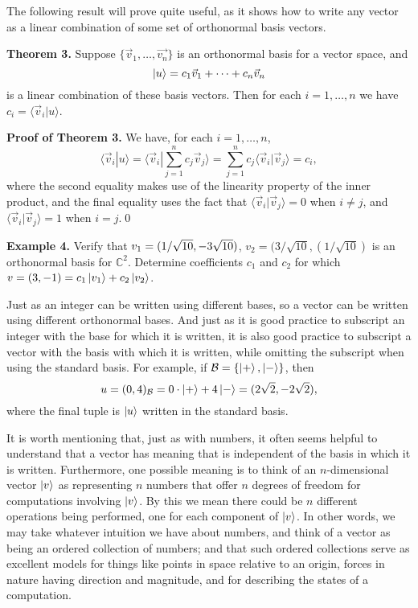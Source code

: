 \documentclass [12pt]{article}
\theoremstyle{definition}
\begin{document}
 The following result will prove quite useful, as it
shows how to write any vector as a linear combination of some set of orthonormal basis vectors.

\textbf{Theorem 3.} Suppose $\{\vec{v}_1,\ldots,\vec{v_n}\}$ is an  orthonormal basis for a vector space, and 
\[\ket{u}=c_1\vec{v}_1+\cdots+c_n\vec{v}_n\]
is
a linear combination of these basis vectors. Then for each $i=1,\ldots,n$ we have $c_i=\langle \vec{v}_i|u\rangle$.

\textbf{Proof of Theorem 3.} We have, for each $i=1,\ldots,n$,
\[\langle \vec{v}_i| u\rangle = \langle \vec{v}_i |\sum_{j=1}^nc_j\vec{v}_j\rangle=\sum_{j=1}^nc_j\langle \vec{v}_i|\vec{v}_j\rangle=c_i,\]
where the second equality makes use of the linearity property of the inner product, and the final equality uses the
fact that $\langle\vec{v}_i|\vec{v}_j\rangle=0$ when $i\not=j$, and  $\langle\vec{v}_i|\vec{v}_j\rangle=1$ when $i=j$.\qed

\textbf{Example 4.} Verify that  $v_1=(1/\sqrt{10},-3\/\sqrt{10})$, $v_2=(3/\sqrt{10},(1/\sqrt{10})$ is an orthonormal basis for $\mathbb{C}^2$. 
Determine coefficients $c_1$ and $c_2$ for which $v=(3,-1)=c_1\ket{v_1} + c_2\ket{v_2}$.


\vspace{3.0in}
Just as an integer can be written using different bases, so a vector can be written using different orthonormal bases. And just as it is good practice to subscript an
integer with the base for which it is written, it is also good practice
to subscript a vector with the basis with which it is written, while omitting the subscript when using the standard basis. For example, if $\mathcal{B}=\{\ket{+},\ket{-}\}$, then 
\[u = (0,4)_{\mathcal{B}}=0\cdot\ket{+} + 4\ket{-} = (2\sqrt{2},-2\sqrt{2}),\]
where the final tuple is $\ket{u}$ written in the standard basis.

It is worth mentioning that, just as with numbers, it often seems helpful to understand that a vector has meaning that is independent of the basis in which it is written.
Furthermore, one possible meaning is to think of an $n$-dimensional vector $\ket{v}$ as representing $n$ numbers that offer $n$ degrees of freedom for computations
involving $\ket{v}$. By this we mean there could be $n$ different operations being performed, one for each component of $\ket{v}$. In other words, we may take whatever
intuition we have about numbers, and think of a vector as being an ordered collection of numbers; and that such ordered collections serve as excellent models for things like
points in space relative to an origin, forces in nature having direction and magnitude, and for describing the states of a computation.
\end{document}
